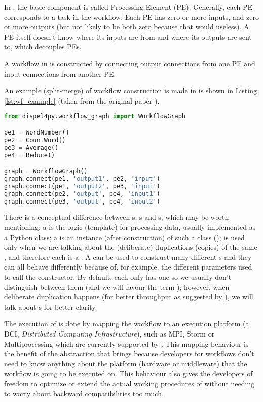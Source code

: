 In \dpy, the basic component is called Processing Element (PE). Generally, each PE corresponds to a task in the workflow. Each PE has zero or more inputs, and zero or more outputs (but not likely to be both zero because that would useless). A PE itself doesn't know where its inputs are from and where its outputs are sent to, which decouples PEs.

A workflow in \dpy is constructed by connecting output connections from one PE and input connections from another PE.

An example (split-merge) of workflow construction is made in \dpy is shown in Listing \ref{lst:wf_example} (taken from the original \dpy paper \cite{doi:10.1177/1094342016649766}).

\begin{lstlisting}[frame=single,caption={Example code of workflow construction in \dpy},captionpos=b,label={lst:wf_example},language=Python]
from dispel4py.workflow_graph import WorkflowGraph

pe1 = WordNumber()
pe2 = CountWord()
pe3 = Average()
pe4 = Reduce()

graph = WorkflowGraph()
graph.connect(pe1, 'output1', pe2, 'input')
graph.connect(pe1, 'output2', pe3, 'input')
graph.connect(pe2, 'output', pe4, 'input1')
graph.connect(pe3, 'output', pe4, 'input2')
\end{lstlisting}


There is a conceptual difference between \tPETmpl{}s, \tPEInst{}s and \tPEDup{}s, which may be worth mentioning: a \tPETmpl is the logic (template) for processing data, usually implemented as a Python class; a \tPEInst is an instance (after construction) of such a class (\tPETmpl); \tPEDup is used only when we are talking about the (deliberate) duplications (copies) of the same \tPEInst, and therefore each \tPEDup is a \tPEInst. A \tPETmpl can be used to construct many different \tPEInst{}s and they can all behave differently because of, for example, the different parameters used to call the constructor. By default, each \tPEInst only has one \tPEDup so we usually don't distinguish between them (and we will favour the term \tPEInst); however, when deliberate duplication happens (\eg for better throughput as suggested by \citeauthor{doi:10.1177/1094342016649766} \cite{doi:10.1177/1094342016649766}), we will talk about \tPEDup{}s for better clarity.

The execution of \dpy is done by mapping the workflow to an execution platform (\ie a DCI, \emph{Distributed Computing Infrastructure}), such as MPI, Storm or Multiprocessing which are currently supported by \dpy. This mapping behaviour is the benefit of the abstraction that \dpy brings because developers for workflows don't need to know anything about the platform (\eg hardware or middleware) that the workflow is going to be executed on. This behaviour also gives the developers of \dpy freedom to optimize or extend the actual working procedures of \dpy without needing to worry about backward compatibilities too much.


